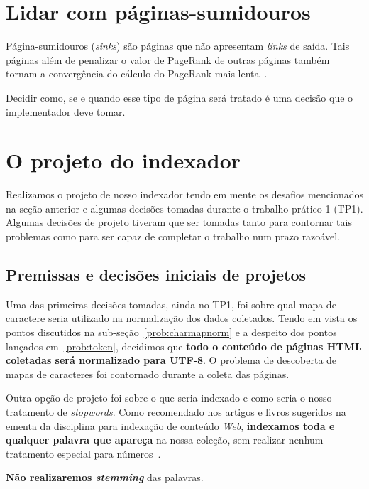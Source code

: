 \documentclass[10pt,twocolumn]{article}
\begin{document}
\section{Lidar com páginas-sumidouros}

Página-sumidouros (\emph{sinks}) são páginas que não apresentam
\emph{links} de saída. Tais páginas além de penalizar o valor de
PageRank de outras páginas também tornam a convergência do cálculo do
PageRank mais lenta~\cite{haveliwala99efficient, page98pagerank}.

Decidir como, se e quando esse tipo de página será tratado é uma decisão
que o implementador deve tomar.


\section{O projeto do indexador}

Realizamos o projeto de nosso indexador tendo em mente os desafios
mencionados na seção anterior e algumas decisões tomadas durante o
trabalho prático 1 (TP1). Algumas decisões de projeto tiveram que
ser tomadas tanto para contornar tais problemas como para ser capaz de
completar o trabalho num prazo razoável.


\subsection{Premissas e decisões iniciais de projetos}

Uma das primeiras decisões tomadas, ainda no TP1, foi sobre qual mapa de
caractere seria utilizado na normalização dos dados coletados.  Tendo em
vista os pontos discutidos na sub-seção~\ref{prob:charmapnorm} e a
despeito dos pontos lançados em~\ref{prob:token}, decidimos que
\textbf{todo o conteúdo de páginas HTML coletadas será normalizado para
UTF-8}. O problema de descoberta de mapas de caracteres foi contornado
durante a coleta das páginas.

Outra opção de projeto foi sobre o que seria indexado e como seria o
nosso tratamento de \emph{stopwords}. Como recomendado nos artigos e
livros sugeridos na ementa da disciplina para indexação de conteúdo
\emph{Web}, \textbf{indexamos toda e qualquer palavra que apareça} na
nossa coleção, sem realizar nenhum tratamento especial para
números~\cite{moffat1999managing}.

\textbf{Não realizaremos \emph{stemming}} das palavras.
\end{document}

